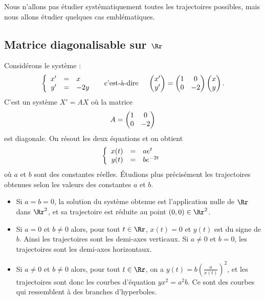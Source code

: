 \documentclass[12pt, class=report,crop=false]{standalone}
\begin{document}
Nous n'allons pas étudier systématiquement toutes les trajectoires possibles, mais nous allons étudier quelques cas emblématiques.


\subsection{Matrice diagonalisable sur $\Rr$}



\begin{exemple}
Considérons le système :
$$\left\{\begin{array}{rcl}x'&=& x\cr y'&=& -2y\end{array}\right.
\quad \text{ c'est-à-dire } \quad
\begin{pmatrix}x'\cr y'\end{pmatrix}
= \begin{pmatrix}1&0\cr 0&-2\end{pmatrix}
\begin{pmatrix}x\cr y\end{pmatrix}.$$
C'est un système $X'=AX$ où la matrice 
$$A=\begin{pmatrix}1&0\cr 0&-2\end{pmatrix}$$
est diagonale. On résout les deux équations et on obtient
$$\left\{\begin{array}{rcl}
x(t) &=& ae^t\cr  
y(t) &=& be^{-2t}
\end{array}\right.$$
où $a$ et $b$ sont des constantes réelles. 
\'Etudions plus précisément les trajectoires obtenues selon les 
valeurs des constantes $a$ et $b$.

\begin{itemize}
  \item Si $a=b=0$, la solution du système obtenue est l'application nulle de 
  $\Rr$ dans $\Rr^2$, et sa trajectoire est réduite au point $(0,0)\in\Rr^2$.

  \item Si $a=0$ et $b\neq 0$ alors, pour tout $t\in\Rr$, $x(t)=0$ 
  et $y(t)$ est du signe de $b$. Ainsi les trajectoires sont les demi-axes verticaux.
  Si $a \neq 0$ et $b = 0$, les trajectoires sont les demi-axes horizontaux.
  
  \item Si $a\neq0$ et $b\neq0$ alors, pour tout $t\in\Rr$, on a 
$y(t)=b\left( \frac{a}{x(t)}\right)^2$, 
et les trajectoires sont donc les courbes d'équation 
$\displaystyle yx^2 = a^2 b$. Ce sont des courbes qui ressemblent à des branches d'hyperboles.
\end{itemize}


\end{exemple}
\end{document}
